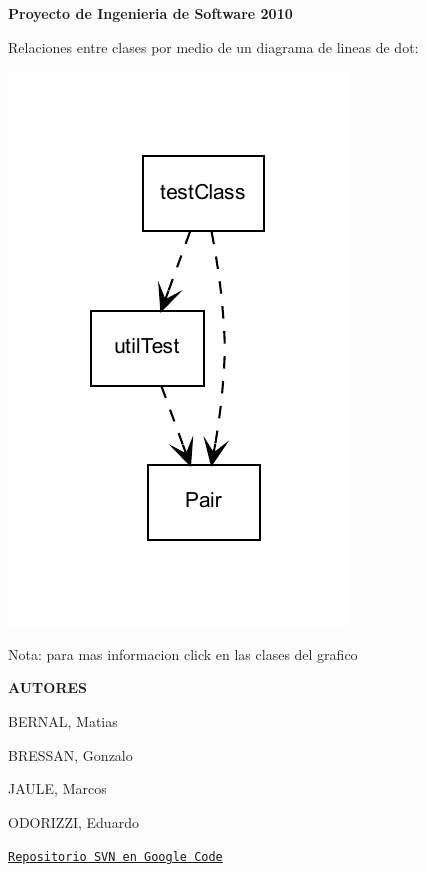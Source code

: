 \begin{center}{\bfseries Proyecto de Ingenieria de Software 2010}\end{center}  \par
 \begin{center} Relaciones entre clases por medio de un diagrama de lineas de dot: \begin{center}

\begin{DoxyImageNoCaption}
  \mbox{\includegraphics[width=\textwidth]{inline_dotgraph_1}}
\end{DoxyImageNoCaption}
\end{center}
 \end{center}  {\itshape \begin{center}Nota: para mas informacion click en las clases del grafico\end{center} \/}

\begin{center} {\bfseries AUTORES} \par
 \par
 BERNAL, Matias \par
 BRESSAN, Gonzalo \par
 JAULE, Marcos \par
 ODORIZZI, Eduardo \end{center}  \par
 \begin{center}\end{center}  \par
 \begin{center} \href{http://is2010final.googlecode.com}{\tt Repositorio SVN en Google Code} \end{center}  